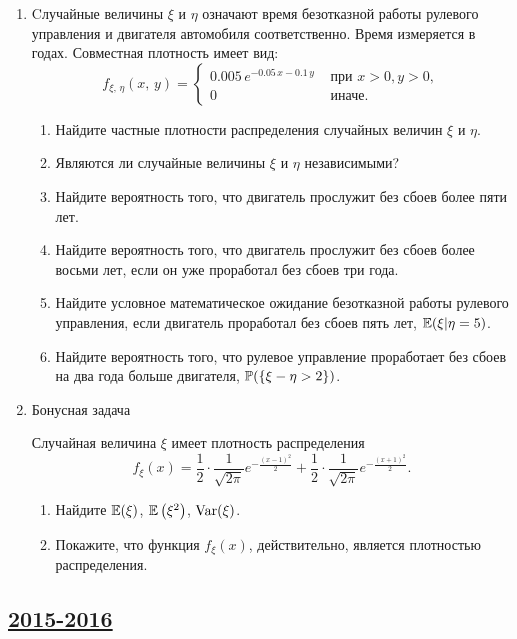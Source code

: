 \begin{enumerate}
\item
Cлучайные величины $\xi$ и $\eta$ означают время безотказной работы рулевого
управления и двигателя автомобиля соответственно. Время измеряется в годах.
Совместная плотность имеет вид:
\[
f_{\xi, \,\eta}(x,\,y) =
\begin{cases}
0.005\,e^{-0.05\,x-0.1\,y} & \text{ при } x > 0, y > 0, \\
0                    & \text{ иначе.}
\end{cases}
\]

\begin{enumerate}
  \item Найдите частные плотности распределения случайных величин $\xi$ и $\eta$.
  \item Являются ли случайные величины $\xi$ и $\eta$ независимыми?
  \item Найдите вероятность того, что двигатель прослужит без сбоев более пяти лет.
  \item Найдите вероятность того, что двигатель прослужит без сбоев более восьми лет,
  если он уже проработал без сбоев три года.
  \item Найдите условное математическое ожидание безотказной работы рулевого управления,
  если двигатель проработал без сбоев пять лет,  $\E(\xi | \eta = 5)$.
  \item Найдите вероятность того, что рулевое управление проработает без сбоев на
  два года больше двигателя, $\P(\{\xi - \eta > 2\})$.
\end{enumerate}

\item Бонусная задача

Случайная величина $\xi$ имеет плотность распределения
\[
f_{\xi}(x) = \frac{1}{2} \cdot \frac{1}{\sqrt{2\pi}}e^{-\frac{(x-1)^2}{2}} + \frac{1}{2} \cdot \frac{1}{\sqrt{2\pi}}e^{-\frac{(x+1)^2}{2}} \text{.}
\]

\begin{enumerate}
\item Найдите $\E(\xi)$, $\E\left(\xi^2\right)$, $\Var(\xi)$.
\item Покажите, что функция $f_{\xi}(x)$, действительно, является плотностью распределения.
\end{enumerate}
\end{enumerate}



\newpage
\subsection[2015-2016]{\hyperref[sec:sol_kr_02_2015_2016]{2015-2016}}
\label{sec:kr_02_2015_2016}

